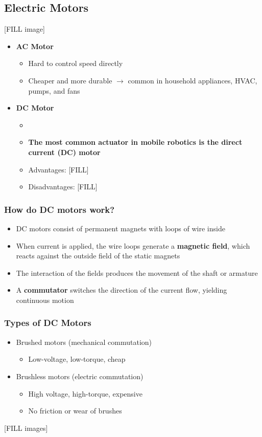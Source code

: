 \documentclass[10pt]{article}
\begin{document}
\subsection*{Electric Motors}
[FILL image]
\begin{itemize}
	\item \textbf{AC Motor}
	\begin{itemize}
        \item Hard to control speed directly
        \item Cheaper and more durable $\rightarrow$ common in household appliances, HVAC, pumps, and fans
    \end{itemize}
    \item \textbf{DC Motor}
    \begin{itemize}
        \item [FILL]
        \item \textbf{The most common actuator in mobile robotics is the direct current (DC) motor}
        \item Advantages: [FILL]
        \item Disadvantages: [FILL]
    \end{itemize}
\end{itemize}

\subsubsection*{How do DC motors work?}
\begin{itemize}
	\item DC motors consist of permanent magnets with loops of wire inside
	\item When current is applied, the wire loops generate a \textbf{magnetic field}, which reacts against the outside field of the static magnets
	\item The interaction of the fields produces the movement of the shaft or armature
	\item A \textbf{commutator} switches the direction of the current flow, yielding continuous motion
\end{itemize}

\subsubsection*{Types of DC Motors}
\begin{itemize}
	\item Brushed motors (mechanical commutation)
	\begin{itemize}
        \item Low-voltage, low-torque, cheap
    \end{itemize}
    \item Brushless motors (electric commutation)
    \begin{itemize}
        \item High voltage, high-torque, expensive
        \item No friction or wear of brushes
    \end{itemize}
\end{itemize}
[FILL images]
\end{document}
